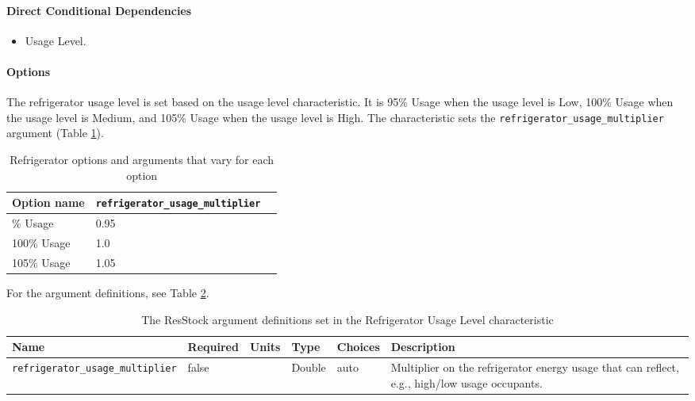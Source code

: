 \paragraph{Direct Conditional Dependencies}
\begin{itemize}
    \item Usage Level.
\end{itemize}

\paragraph{Options}
The refrigerator usage level is set based on the usage level characteristic. It is 95\% Usage when the usage level is Low, 100\% Usage when the usage level is Medium, and 105\% Usage when the usage level is High. The characteristic sets the \texttt{refrigerator\_usage\_multiplier} argument (Table \ref{table:hc_opt_ref_use}).

\begin{longtable}[]{ |p{}|p{4cm}|p{4cm}| }
\caption{Refrigerator options and arguments that vary for each option} \label{table:hc_opt_ref_use} \\
\toprule\noalign{}
Option name &
\texttt{refrigerator\_usage\_multiplier} \\
\midrule\noalign{}
\endhead
\bottomrule\noalign{}
\endlastfoot
95\% Usage & 0.95 \\
100\% Usage & 1.0 \\
105\% Usage & 1.05 \\
\end{longtable}

For the argument definitions, see Table \ref{table:hc_arg_def_refrigerator_usage_level}. %
\begin{longtable}[]{ |p{}|p{1.5cm}|p{1cm}|p{1.1cm}|p{1.4cm}|p{6cm}| }
\caption{The ResStock argument definitions set in the Refrigerator Usage Level characteristic} \label{table:hc_arg_def_refrigerator_usage_level}\\
\toprule\noalign{}
Name & Required & Units & Type & Choices & Description \\
\midrule\noalign{}
\endhead
\bottomrule\noalign{}
\endlastfoot
\texttt{refrigerator\_usage\_multiplier} & false & & Double & auto &
Multiplier on the refrigerator energy usage that can reflect, e.g.,
high/low usage occupants.  \\
\end{longtable}

